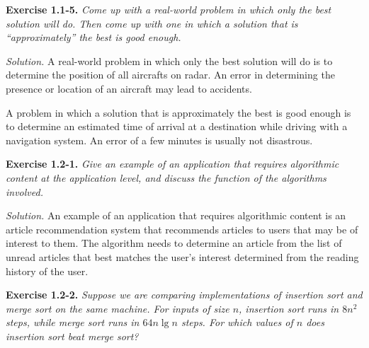 \documentclass[oneside]{book}
\newenvironment{itenv}[2]
               {\begin{trivlist}\item \textbf{#1 #2.} \itshape}
               {\end{trivlist}}
\newenvironment{exercise}[1]{\begin{itenv}{Exercise}{#1}}{\end{itenv}}
\newenvironment{solution}{\textit{Solution.}}{\vspace{12pt}}
\begin{document}
\begin{exercise}{1.1-5}
Come up with a real-world problem in which only the best solution will
do. Then come up with one in which a solution that is ``approximately''
the best is good enough.
\end{exercise}

\begin{solution}
A real-world problem in which only the best solution will do is to
determine the position of all aircrafts on radar. An error in
determining the presence or location of an aircraft may lead to
accidents.

A problem in which a solution that is approximately the best is good
enough is to determine an estimated time of arrival at a destination
while driving with a navigation system. An error of a few minutes is
usually not disastrous.
\end{solution}

\begin{exercise}{1.2-1}
Give an example of an application that requires algorithmic content at
the application level, and discuss the function of the algorithms
involved.
\end{exercise}

\begin{solution}
An example of an application that requires algorithmic content is an
article recommendation system that recommends articles to users that may
be of interest to them. The algorithm needs to determine an article from
the list of unread articles that best matches the user's interest
determined from the reading history of the user.
\end{solution}

\begin{exercise}{1.2-2}
Suppose we are comparing implementations of insertion sort and merge
sort on the same machine. For inputs of size \( n \), insertion sort
runs in \( 8n^2 \) steps, while merge sort runs in \(64 n \lg n\) steps.
For which values of \( n \) does insertion sort beat merge sort?
\end{exercise}
\end{document}
